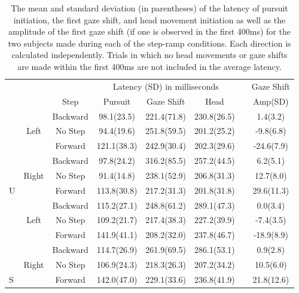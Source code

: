 \documentclass[12pt]{article}
\begin{document}
\begin{table}[h]
\begin{tabular}{lccccccc}
 &  &  & \multicolumn{3}{c}{Latency (SD) in milliseconds} &  & Gaze Shift \\ \cline{4-6}
 &  & Step & Pursuit & Gaze Shift & Head &  & Amp(SD) \\
 & \cellcolor[HTML]{EFEFEF} & \cellcolor[HTML]{EFEFEF}Backward & \cellcolor[HTML]{EFEFEF}98.1(23.5) & \cellcolor[HTML]{EFEFEF}221.4(71.8) & \cellcolor[HTML]{EFEFEF}230.8(26.5) &  & \cellcolor[HTML]{EFEFEF}1.4(3.2) \\
 & \cellcolor[HTML]{EFEFEF}Left & \cellcolor[HTML]{EFEFEF}No Step & \cellcolor[HTML]{EFEFEF}94.4(19.6) & \cellcolor[HTML]{EFEFEF}251.8(59.5) & \cellcolor[HTML]{EFEFEF}201.2(25.2) &  & \cellcolor[HTML]{EFEFEF}-9.8(6.8) \\
 & \cellcolor[HTML]{EFEFEF} & \cellcolor[HTML]{EFEFEF}Forward & \cellcolor[HTML]{EFEFEF}121.1(38.3) & \cellcolor[HTML]{EFEFEF}242.9(30.4) & \cellcolor[HTML]{EFEFEF}202.3(29.6) &  & \cellcolor[HTML]{EFEFEF}-24.6(7.9) \\
 &  & Backward & 97.8(24.2) & 316.2(85.5) & 257.2(44.5) &  & 6.2(5.1) \\
 & Right & No Step & 91.4(14.8) & 238.1(52.9) & 206.8(31.3) &  & 12.7(8.0) \\
\multirow{-6}{*}{U} &  & Forward & 113.8(30.8) & 217.2(31.3) & 201.8(31.8) &  & 29.6(11.3) \\
 & \cellcolor[HTML]{EFEFEF} & \cellcolor[HTML]{EFEFEF}Backward & \cellcolor[HTML]{EFEFEF}115.2(27.1) & \cellcolor[HTML]{EFEFEF}248.8(61.2) & \cellcolor[HTML]{EFEFEF}289.1(47.3) &  & \cellcolor[HTML]{EFEFEF}0.0(3.4) \\
 & \cellcolor[HTML]{EFEFEF}Left & \cellcolor[HTML]{EFEFEF}No Step & \cellcolor[HTML]{EFEFEF}109.2(21.7) & \cellcolor[HTML]{EFEFEF}217.4(38.3) & \cellcolor[HTML]{EFEFEF}227.2(39.9) &  & \cellcolor[HTML]{EFEFEF}-7.4(3.5) \\
 & \cellcolor[HTML]{EFEFEF} & \cellcolor[HTML]{EFEFEF}Forward & \cellcolor[HTML]{EFEFEF}141.9(41.1) & \cellcolor[HTML]{EFEFEF}208.2(32.0) & \cellcolor[HTML]{EFEFEF}237.8(46.7) &  & \cellcolor[HTML]{EFEFEF}-18.9(8.9) \\
 &  & Backward & 114.7(26.9) & 261.9(69.5) & 286.1(53.1) &  & 0.9(2.8) \\
 & Right & No Step & 106.9(24.3) & 218.3(26.3) & 207.2(34.2) &  & 10.5(6.0) \\
\multirow{-6}{*}{S} &  & Forward & 142.0(47.0) & 229.1(33.6) & 236.8(41.9) &  & 21.8(12.6)
\end{tabular}
\caption[Latency during Step Ramp]{The mean and standard deviation (in parentheses) of the latency of pursuit initiation, the first gaze shift, and head movement initiation as well as the amplitude of the first gaze shift (if one is observed in the first 400ms) for the two subjects made during each of the step-ramp conditions. Each direction is calculated independently. Trials in which no head movements or gaze shifts are made within the first 400ms are not included in the average latency.}
\end{table}
\end{document}
